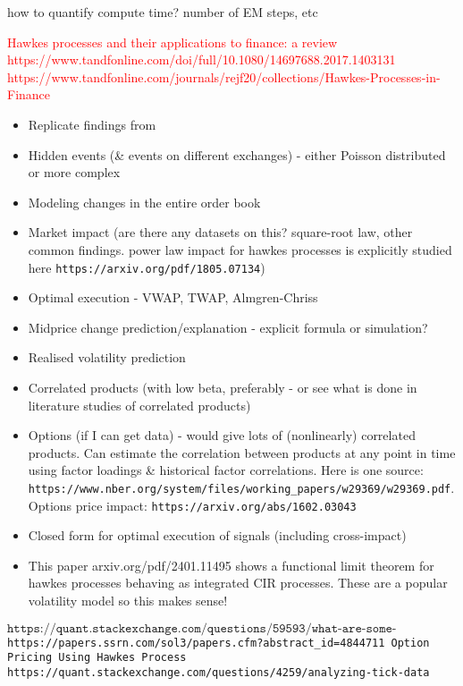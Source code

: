 \documentclass[honours,12pt]{unswthesis}
\numberwithin{equation}{section}
\begin{document}
how to quantify compute time? number of EM steps, etc

\textcolor{red}{Hawkes processes and their applications to finance: a review https://www.tandfonline.com/doi/full/10.1080/14697688.2017.1403131}
\textcolor{red}{https://www.tandfonline.com/journals/rejf20/collections/Hawkes-Processes-in-Finance}


\begin{itemize}
	\item Replicate findings from \cite{MorariuPatrichiPakkanen}
	\item Hidden events (\& events on different exchanges) - either Poisson distributed or more complex
	\item Modeling changes in the entire order book
	\item Market impact (are there any datasets on this? square-root law, other common findings. power law impact for hawkes processes is explicitly studied here \texttt{https://arxiv.org/pdf/1805.07134})
	\item Optimal execution - VWAP, TWAP, Almgren-Chriss
	\item Midprice change prediction/explanation - explicit formula or simulation?
	\item Realised volatility prediction
	\item Correlated products (with low beta, preferably - or see what is done in literature studies of correlated products)
	\item Options (if I can get data) - would give lots of (nonlinearly) correlated products. Can estimate the correlation between products at any point in time using factor loadings \& historical factor correlations. Here is one source: \texttt{https://www.nber.org/system/files/working_papers/w29369/w29369.pdf}. Options price impact: \texttt{https://arxiv.org/abs/1602.03043}
	\item Closed form for optimal execution of signals (including cross-impact)
	\item This paper arxiv.org/pdf/2401.11495 shows a functional limit theorem for hawkes processes behaving as integrated CIR processes. These are a popular volatility model so this makes sense!
\end{itemize}

$\texttt{https://quant.stackexchange.com/questions/59593/what-are-some-currently-open-problems-in-market-microstructure}$
\texttt{https://papers.ssrn.com/sol3/papers.cfm?abstract_id=4844711 Option Pricing Using Hawkes Process}
\texttt{https://quant.stackexchange.com/questions/4259/analyzing-tick-data}
\end{document}
